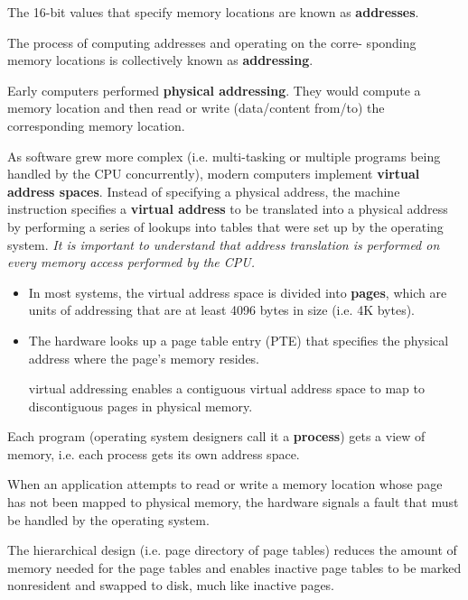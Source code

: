 \begin{mdframed}

The 16-bit values that specify memory locations are known as {\bf addresses}.

The process of computing addresses and operating on the corre- sponding memory
locations is collectively known as {\bf addressing}.

Early computers performed {\bf physical addressing}. They would compute a memory
location and then read or write (data/content from/to) the corresponding memory
location.

As software grew more complex (i.e. multi-tasking or multiple programs being
handled by the CPU concurrently), modern computers implement {\bf virtual
address spaces}. Instead of specifying a physical address, the machine
instruction specifies a {\bf virtual address} to be translated into a physical
address by performing a series of lookups into tables that were set up by the
operating system.
{\it It is important to understand that address translation is performed on every
memory access performed by the CPU.}

\begin{itemize}
  \item   In most systems, the virtual address space is divided into {\bf pages}, 
  which are units of addressing that are at least 4096 bytes in size (i.e. 4K bytes).
  
  \item The hardware looks up a page table entry (PTE) that specifies the
  physical address where the page’s memory resides.
  
  virtual addressing enables a contiguous virtual address space to map to
  discontiguous pages in physical memory.
    
\end{itemize}

Each program (operating system designers call it a {\bf process}) gets a view of memory, i.e.
each process gets its own address space.

When an application attempts to read or write a memory location whose page has
not been mapped to physical memory, the hardware signals a fault that must be
handled by the operating system.


The hierarchical design (i.e. page directory of page tables) reduces the amount
of memory needed for the page tables and enables inactive page tables to be
marked nonresident and swapped to disk, much like inactive pages.


\end{mdframed}
